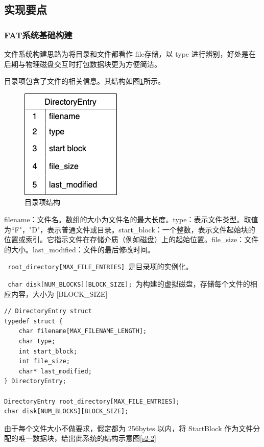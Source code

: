 \documentclass{article}
\begin{document}
\subsection{实现要点}

\subsubsection{FAT系统基础构建}

文件系统构建思路为将目录和文件都看作 file存储，以 type 进行辨别，好处是在后期与物理磁盘交互时打包数据块更为方便简洁。

目录项包含了文件的相关信息。其结构如图\ref{s2-1}所示。

\begin{figure}[H]
\center
\includegraphics[scale = 0.6]{s2-1.png}
\caption{目录项结构}
\label{s2-1}
\end{figure}

filename：文件名。数组的大小为文件名的最大长度。type：表示文件类型。取值为“F"，"D"，表示普通文件或目录。start\_block：一个整数，表示文件起始块的位置或索引。它指示文件在存储介质（例如磁盘）上的起始位置。file\_size：文件的大小。last\_modified：文件的最后修改时间。

\verb| root_directory[MAX_FILE_ENTRIES] |是目录项的实例化。

\verb| char disk[NUM_BLOCKS][BLOCK_SIZE]; |为构建的虚拟磁盘，存储每个文件的相应内容，大小为 [BLOCK\_SIZE]

\begin{lstlisting}
// DirectoryEntry struct
typedef struct {
    char filename[MAX_FILENAME_LENGTH];
    char type;
    int start_block;
    int file_size;
    char* last_modified;
} DirectoryEntry;

DirectoryEntry root_directory[MAX_FILE_ENTRIES];
char disk[NUM_BLOCKS][BLOCK_SIZE];
\end{lstlisting}

由于每个文件大小不做要求，假定都为 256bytes 以内，将 StartBlock 作为文件分配的唯一数据块，给出此系统的结构示意图\ref{s2-2}
\end{document}
